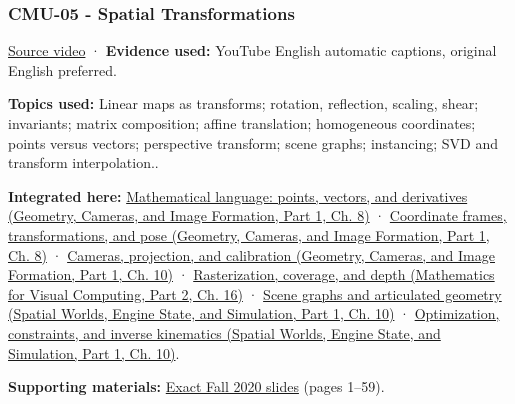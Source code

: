 \subsubsection{CMU-05 - Spatial Transformations}\label{04-visual-computing-ii-ch036-cmu-05---spatial-transformations}

\hypertarget{04-visual-computing-ii-ch036-cmu-05---spatial-transformations}{}

\href{https://www.youtube.com/watch?v=QmFBHSJS0Gw}{Source video} · \textbf{Evidence used:} YouTube English automatic captions, original English preferred.

\textbf{Topics used:} Linear maps as transforms; rotation, reflection, scaling, shear; invariants; matrix composition; affine translation; homogeneous coordinates; points versus vectors; perspective transform; scene graphs; instancing; SVD and transform interpolation..

\textbf{Integrated here:} \href{../03-Geometry-Cameras-and-Image-Formation-P01/main.pdf\#03-visual-computing-i-ch001-mathematical-language-points-vectors-and-derivatives}{Mathematical language: points, vectors, and derivatives (Geometry, Cameras, and Image Formation, Part 1, Ch. 8)} · \href{../03-Geometry-Cameras-and-Image-Formation-P01/main.pdf\#03-visual-computing-i-ch001-coordinate-frames-transformations-and-pose}{Coordinate frames, transformations, and pose (Geometry, Cameras, and Image Formation, Part 1, Ch. 8)} · \href{../03-Geometry-Cameras-and-Image-Formation-P01/main.pdf\#03-visual-computing-i-ch003-cameras-projection-and-calibration}{Cameras, projection, and calibration (Geometry, Cameras, and Image Formation, Part 1, Ch. 10)} · \href{../02-Mathematics-for-Visual-Computing-P02/main.pdf\#03-visual-computing-i-ch012-rasterization-coverage-and-depth}{Rasterization, coverage, and depth (Mathematics for Visual Computing, Part 2, Ch. 16)} · \href{../05-Spatial-Worlds-Engine-State-and-Simulation-P01/main.pdf\#04-visual-computing-ii-ch029-scene-graphs-and-articulated-geometry}{Scene graphs and articulated geometry (Spatial Worlds, Engine State, and Simulation, Part 1, Ch. 10)} · \href{../05-Spatial-Worlds-Engine-State-and-Simulation-P01/main.pdf\#04-visual-computing-ii-ch029-optimization-constraints-and-inverse-kinematics}{Optimization, constraints, and inverse kinematics (Spatial Worlds, Engine State, and Simulation, Part 1, Ch. 10)}.

\textbf{Supporting materials:} \href{https://15462.courses.cs.cmu.edu/fall2020content/lectures/05_transformations/05_transformations_slides.pdf}{Exact Fall 2020 slides} (pages 1--59).

